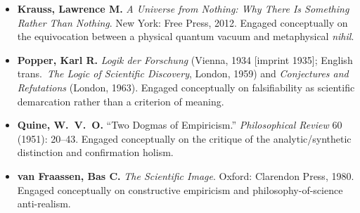 \begin{itemize}
\item \textbf{Krauss, Lawrence M.} \emph{A Universe from Nothing: Why There Is Something Rather Than Nothing}. New York: Free Press, 2012. Engaged conceptually on the equivocation between a physical quantum vacuum and metaphysical \emph{nihil}.
\item \textbf{Popper, Karl R.} \emph{Logik der Forschung} (Vienna, 1934 [imprint 1935]; English trans.\ \emph{The Logic of Scientific Discovery}, London, 1959) and \emph{Conjectures and Refutations} (London, 1963). Engaged conceptually on falsifiability as scientific demarcation rather than a criterion of meaning.
\item \textbf{Quine, W.\ V.\ O.} ``Two Dogmas of Empiricism.'' \emph{Philosophical Review} 60 (1951): 20--43. Engaged conceptually on the critique of the analytic/synthetic distinction and confirmation holism.
\item \textbf{van Fraassen, Bas C.} \emph{The Scientific Image}. Oxford: Clarendon Press, 1980. Engaged conceptually on constructive empiricism and philosophy-of-science anti-realism.
\end{itemize}
